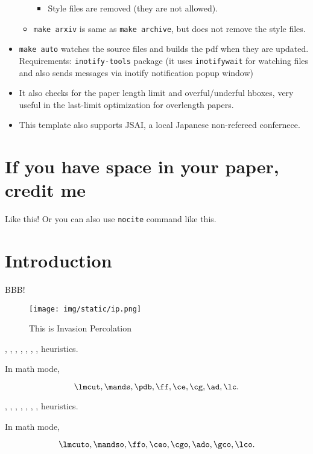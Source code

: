 \begin{itemize}
\begin{itemize}
    \begin{itemize}
    
    \item
      Style files are removed (they are not allowed).
    \end{itemize}
  \item
    \texttt{make\ arxiv} is same as \texttt{make\ archive}, but does not
    remove the style files.
  \end{itemize}
\item
  \texttt{make\ auto} watches the source files and builds the pdf when
  they are updated. Requirements: \texttt{inotify-tools} package (it
  uses \texttt{inotifywait} for watching files and also sends messages
  via inotify notification popup window)
\item
  It also checks for the paper length limit and overful/underful hboxes,
  very useful in the last-limit optimization for overlength papers.
\item
  This template also supports JSAI, a local Japanese non-refereed
  confernece.
\end{itemize}



\section{If you have space in your paper, credit me}

Like this! \cite{aaai-template}
Or you can also use \texttt{nocite} command like this. \nocite{aaa-template}

\section{Introduction}

BBB!  \cite{Asai2016}

\begin{figure}[tb]
 \texttt{[image: img/static/ip.png]}
 \caption{This is Invasion Percolation}
 \label{fig:ip}
\end{figure}

\lmcut, \mands, \pdb, \ff, \ce, \cg, \ad, \lc heuristics.

In math mode,

\[
 \lmcut, \mands, \pdb, \ff, \ce, \cg, \ad, \lc.
\]

\lmcuto, \mandso, \ffo, \ceo, \cgo, \ado, \gco, \lco heuristics.

In math mode,

\[
 \lmcuto, \mandso, \ffo, \ceo, \cgo, \ado, \gco, \lco.
\]


